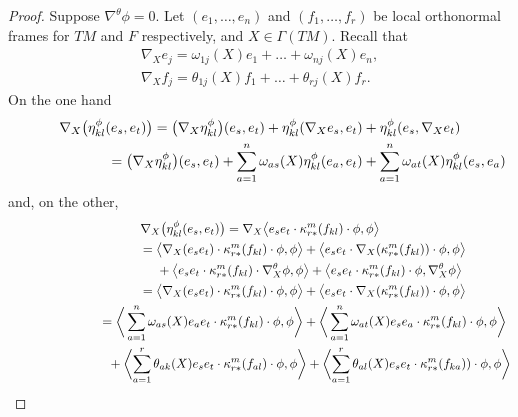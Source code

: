\documentclass[10pt,a4paper]{amsart}
\numberwithin{equation}{section}
\begin{document}
\begin{proof}\allowdisplaybreaks Suppose $\nabla^\theta \phi=0$. Let $(e_1,\dots,e_n)$ and $(f_1,\dots,f_r)$ be local orthonormal frames for $TM$ and $F$ respectively,
and $X\in\Gamma(TM)$. Recall that
\begin{gather*}
\nabla_Xe_j = \omega_{1j}(X) e_1 +\dots +\omega_{nj}(X) e_n ,\\
\nabla_Xf_j = \theta_{1j}(X) f_1 +\dots +\theta_{rj}(X) f_r.
\end{gather*}
On the one hand
\begin{gather*}
 \nabla_X \big(\eta_{kl}^\phi(e_s,e_t)\big) = \big(\nabla_X \eta_{kl}^\phi\big)(e_s,e_t) + \eta_{kl}^\phi(\nabla_Xe_s,e_t)+\eta_{kl}^\phi(e_s,\nabla_Xe_t)\\
\hphantom{\nabla_X \big(\eta_{kl}^\phi(e_s,e_t)\big)}{} = \big(\nabla_X \eta_{kl}^\phi\big)(e_s,e_t) +
\sum_{a=1}^n\omega_{as}(X)\eta_{kl}^\phi(e_a,e_t)+\sum_{a=1}^n\omega_{at}(X)\eta_{kl}^\phi(e_s,e_a)
\end{gather*}
and, on the other,
\begin{gather*}
 \nabla_X \big(\eta_{kl}^\phi(e_s,e_t)\big) = \nabla_X \big\langle e_s e_t\cdot \kappa_{r*}^m(f_{kl}) \cdot \phi,\phi \big\rangle \\
\hphantom{\nabla_X \big(\eta_{kl}^\phi(e_s,e_t)\big)}{}
 = \big\langle \nabla_X (e_s e_t)\cdot \kappa_{r*}^m(f_{kl}) \cdot \phi,\phi \big\rangle
+\big\langle e_s e_t\cdot \nabla_X (\kappa_{r*}^m(f_{kl})) \cdot \phi,\phi \big\rangle \\
\hphantom{\nabla_X \big(\eta_{kl}^\phi(e_s,e_t)\big)=}{}
 +\big\langle e_s e_t\cdot \kappa_{r*}^m(f_{kl}) \cdot \nabla_X^\theta \phi,\phi \big\rangle
+\big\langle e_s e_t\cdot \kappa_{r*}^m(f_{kl}) \cdot \phi,\nabla_X^\theta\phi \big\rangle \\
\hphantom{\nabla_X \big(\eta_{kl}^\phi(e_s,e_t)\big)}{}
 = \big\langle \nabla_X (e_s e_t)\cdot \kappa_{r*}^m(f_{kl}) \cdot \phi,\phi \big\rangle
+\big\langle e_s e_t\cdot \nabla_X (\kappa_{r*}^m(f_{kl})) \cdot \phi,\phi \big\rangle \\
\hphantom{\nabla_X \big(\eta_{kl}^\phi(e_s,e_t)\big)}{}
 = \bigg\langle \sum_{a=1}^n\omega_{as}(X)e_a e_t\cdot \kappa_{r*}^m(f_{kl}) \cdot \phi,\phi \bigg\rangle
+\bigg\langle \sum_{a=1}^n\omega_{at}(X)e_s e_a\cdot \kappa_{r*}^m(f_{kl}) \cdot \phi,\phi \bigg\rangle \\
\hphantom{\nabla_X \big(\eta_{kl}^\phi(e_s,e_t)\big)=}{}
 +\bigg\langle\! \sum_{a=1}^r\theta_{ak}(X)e_s e_t\cdot \kappa_{r*}^m(f_{al}) \cdot \phi,\phi \bigg\rangle
+\bigg\langle\! \sum_{a=1}^r\theta_{al}(X)e_s e_t\cdot \kappa_{r*}^m(f_{ka})) \cdot \phi,\phi \bigg\rangle \\

\end{gather*}
\end{proof}
\end{document}

